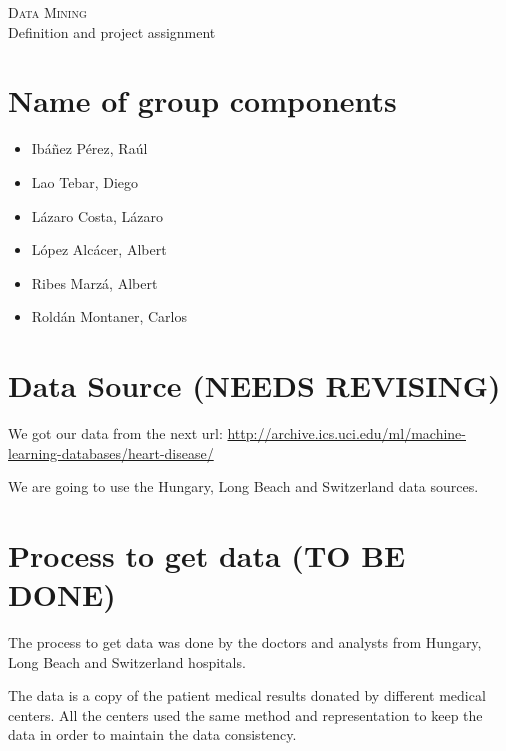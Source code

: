 \documentclass[a4paper,12pt]{article}
\begin{document}
\begin{center}
    \huge{\textsc{Data Mining} \\ Definition and project assignment}
\end{center}


% 

\section{Name of group components}

    \begin{itemize}
    
        \item Ibáñez Pérez, Raúl
        \item Lao Tebar, Diego
        \item Lázaro Costa, Lázaro
        \item López Alcácer, Albert
        \item Ribes Marzá, Albert
        \item Roldán Montaner, Carlos
        
    \end{itemize}

\section{Data Source (\textbf{NEEDS REVISING})}
    
    We got our data from the next url: \url{http://archive.ics.uci.edu/ml/machine-learning-databases/heart-disease/} \newline
    
    We are going to use the Hungary, Long Beach and Switzerland data sources.

\section{Process to get data (\textbf{TO BE DONE})}
    The process to get data was done by the doctors and analysts from Hungary, Long Beach and Switzerland hospitals.
    
    The data is a copy of the patient medical results donated by different medical centers. All the centers used the same method and representation to keep the data in order to maintain the data consistency.
\end{document}
